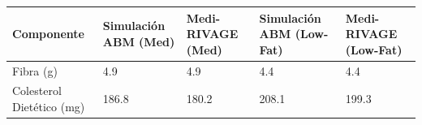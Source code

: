 \begin{tabular}{lllll}
\toprule
Componente & Simulación ABM (Med) & Medi-RIVAGE (Med) & Simulación ABM (Low-Fat) & Medi-RIVAGE (Low-Fat) \\
\midrule
Fibra (g) & 4.9 & 4.9 & 4.4 & 4.4 \\
Colesterol Dietético (mg) & 186.8 & 180.2 & 208.1 & 199.3 \\
\bottomrule
\end{tabular}
